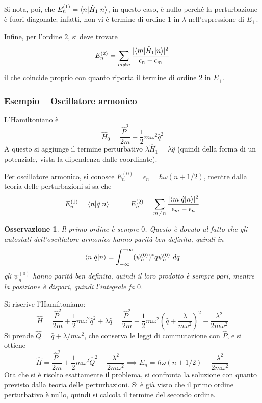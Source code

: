 \documentclass[11pt, a4paper]{scrartcl} %
\numberwithin{equation}{subsection}
\theoremstyle{style2}
\newtheorem{osservazione}{Osservazione}[section]
\theoremstyle{style1}
\newenvironment{boxenv}[1][]{
    \begin{eqbox}[#1]
    }{
   \end{eqbox}
}
\begin{document}
Si nota, poi, che $E^{(1)} _n = \braket{n|\hat{H}_1|n} $, in questo caso, \`e nullo perch\'e la perturbazione \`e fuori diagonale; infatti, non vi \`e termine di ordine $1$ in $\lambda $ nell'espressione di $E_+$.

Infine, per l'ordine $2$, si deve trovare 
\[
E^{(2)} _n = \sum_{m\neq n}^{} \frac{\lvert \braket{m|\hat{H}_1|n}  \rvert ^2}{\epsilon _n - \epsilon _m}
\] 
il che coincide proprio con quanto riporta il termine di ordine $2$ in $E_+$.

\subsubsection{Esempio -- Oscillatore armonico}
L'Hamiltoniano \`e
\[
\hat{H}_0 = \frac{\hat{P}^2}{2m} + \frac{1}{2}m\omega^2 \hat{q}^2 
\] 
A questo si aggiunge il termine perturbativo $\lambda \hat{H}_1 = \lambda \hat{q}$ (quindi della forma di un potenziale, vista la dipendenza dalle coordinate).

Per oscillatore armonico, si conosce $E^{(0)} _n = \epsilon _n = \hbar \omega (n  + 1/2)$, mentre dalla teoria delle perturbazioni si sa che
\[
E^{(1)} _n = \braket{n|\hat{q}|n} \hspace{1cm}E^{(2)} _n = \sum_{m\neq n}^{} \frac{\lvert \braket{m|\hat{q}|n}  \rvert ^2 }{\epsilon _m - \epsilon _n}
\] 
\begin{boxenv}[]
\begin{osservazione}
Il primo ordine \`e sempre $0$. 
Questo \`e dovuto al fatto che gli autostati dell'oscillatore armonico hanno parit\`a ben definita, quindi in
\[
\braket{n|\hat{q}|n} = \int_{-\infty}^{+\infty} (\psi ^{(0)} _n )^*q \psi _n ^{(0)} \ dq
\] 
gli $\psi ^{(0)} _n$ hanno parit\`a ben definita, quindi il loro prodotto \`e sempre pari, mentre la posizione \`e dispari, quindi l'integrale fa $0$.
\end{osservazione}
\end{boxenv}
Si riscrive l'Hamiltoniano:
\[
\hat{H} = \frac{ \hat{P}^2 }{2m} + \frac{1}{2} m\omega^2 \hat{q}^2 + \lambda \hat{q} = \frac{\hat{P}^2}{2m} + \frac{1}{2}m\omega^2 \left(\hat{q}+ \frac{\lambda }{m\omega^2}\right) ^2 - \frac{\lambda ^2 }{2m\omega^2}
\] 
Si prende $\hat{Q} = \hat{q} + \lambda  / m\omega^2$, che conserva le leggi di commutazione con $\hat{P}$, e si ottiene
\[
\hat{H} = \frac{\hat{P}^2}{2m} + \frac{1}{2} m\omega^2 \hat{Q}^2 - \frac{\lambda ^2}{2m\omega^2}\implies E_n = \hbar  \omega (n + 1 / 2) - \frac{\lambda ^2}{2m\omega^2}
\] 
Ora che si \`e risolto esattamente il problema, si confronta la soluzione con quanto previsto dalla teoria delle perturbazioni. 
Si \`e gi\`a visto che il primo ordine perturbativo \`e nullo, quindi si calcola il termine del secondo ordine. 
\end{document}
